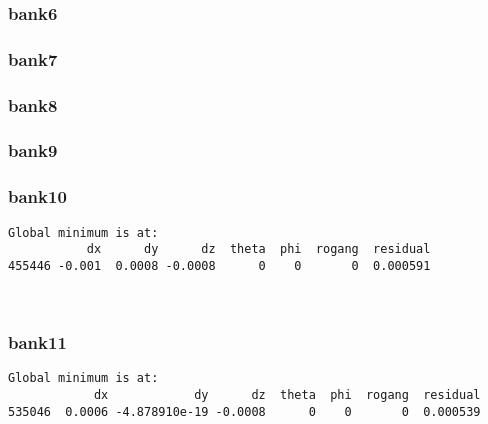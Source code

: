 \documentclass[11pt]{article}
\begin{document}
    \hypertarget{bank6}{%
\subsubsection{bank6}\label{bank6}}

    \hypertarget{bank7}{%
\subsubsection{bank7}\label{bank7}}

    \hypertarget{bank8}{%
\subsubsection{bank8}\label{bank8}}

    \hypertarget{bank9}{%
\subsubsection{bank9}\label{bank9}}

    \hypertarget{bank10}{%
\subsubsection{bank10}\label{bank10}}

    \begin{Verbatim}[commandchars=\\\{\}]
Global minimum is at:
           dx      dy      dz  theta  phi  rogang  residual
455446 -0.001  0.0008 -0.0008      0    0       0  0.000591
    \end{Verbatim}

    \begin{center}
    \end{center}
    { \hspace*{\fill} \\}
    
    \hypertarget{bank11}{%
\subsubsection{bank11}\label{bank11}}

    \begin{Verbatim}[commandchars=\\\{\}]
Global minimum is at:
            dx            dy      dz  theta  phi  rogang  residual
535046  0.0006 -4.878910e-19 -0.0008      0    0       0  0.000539
    \end{Verbatim}
\end{document}
